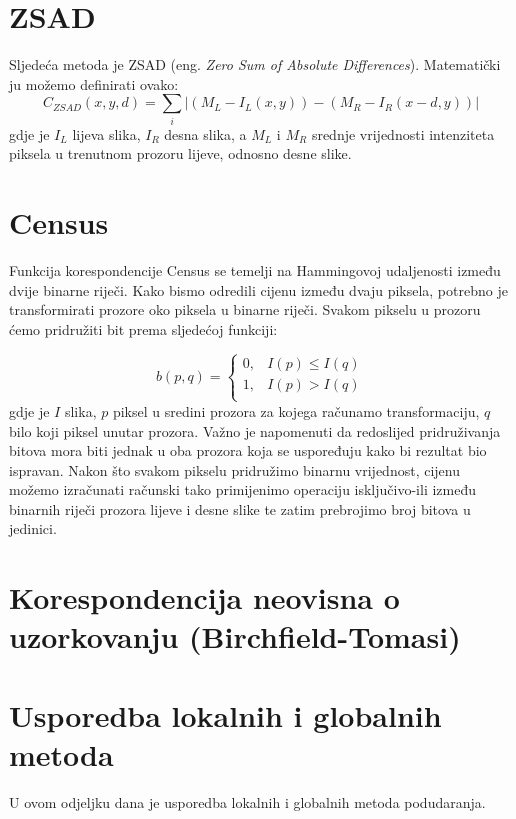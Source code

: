 \documentclass[utf8, zavrsni, numeric]{fer}
\begin{document}
\section{ZSAD}

Sljedeća metoda je ZSAD ({eng. \sl Zero Sum of Absolute Differences}). Matematički ju možemo definirati ovako:
$$C_{ZSAD}(x, y, d) = \sum_{i}\lvert(M_L - I_L(x, y)) - (M_R - I_R(x - d, y))\rvert$$
gdje je $I_L$ lijeva slika, $I_R$ desna slika, a $M_L$ i $M_R$ srednje vrijednosti intenziteta piksela u trenutnom prozoru lijeve, odnosno desne slike.
\section{Census}

Funkcija korespondencije Census se temelji na Hammingovoj udaljenosti između dvije binarne riječi. Kako bismo odredili cijenu između dvaju piksela, potrebno je transformirati
prozore oko piksela u binarne riječi. Svakom pikselu u prozoru ćemo pridružiti bit prema sljedećoj funkciji:

\[   
b(p, q) = 
     \begin{cases}
       0, & I(p) \leq I(q) \\
       1, & I(p) \gt I(q) \\
     \end{cases}
\]
gdje je $I$ slika, $p$ piksel u sredini prozora za kojega računamo transformaciju, $q$ bilo koji piksel unutar prozora. Važno je napomenuti da redoslijed pridruživanja bitova mora biti jednak u oba
prozora koja se uspoređuju kako bi rezultat bio ispravan. Nakon što svakom pikselu pridružimo binarnu vrijednost, cijenu možemo izračunati
računski tako primijenimo operaciju isključivo-ili između binarnih riječi prozora lijeve i desne slike te zatim prebrojimo broj bitova u jedinici.

\section{Korespondencija neovisna o uzorkovanju (Birchfield-Tomasi)}

\section{Usporedba lokalnih i globalnih metoda}
U ovom odjeljku dana je usporedba lokalnih i globalnih metoda podudaranja.
\end{document}
